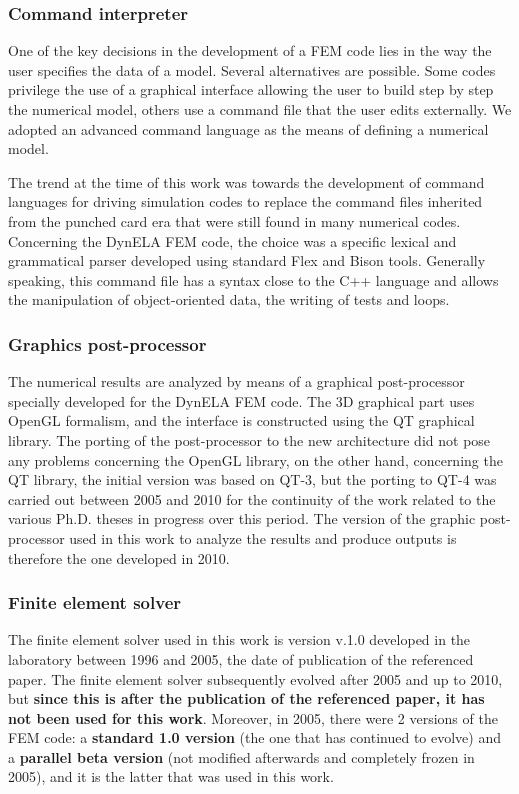 \subsubsection{Command interpreter}
One of the key decisions in the development of a FEM code lies in the way the user specifies the data of a model. Several alternatives are possible. Some codes privilege the use of a graphical interface allowing the user to build step by step the numerical model, others use a command file that the user edits externally. We adopted an advanced command language as the means of defining a numerical model. 

The trend at the time of this work was towards the development of command languages for driving simulation codes to replace the command files inherited from the punched card era that were still found in many numerical codes. Concerning the DynELA FEM code, the choice was a specific lexical and grammatical parser developed using standard Flex and Bison tools. Generally speaking, this command file has a syntax close to the C++ language and allows the manipulation of object-oriented data, the writing of tests and loops. 
 
\subsubsection{Graphics post-processor}

The numerical results are analyzed by means of a graphical post-processor specially developed for the DynELA FEM code. The 3D graphical part uses OpenGL formalism, and the interface is constructed using the QT graphical library. The porting of the post-processor to the new architecture did not pose any problems concerning the OpenGL library, on the other hand, concerning the QT library, the initial version was based on QT-3, but the porting to QT-4 was carried out between 2005 and 2010 for the continuity of the work related to the various Ph.D. theses in progress over this period. The version of the graphic post-processor used in this work to analyze the results and produce outputs is therefore the one developed in 2010.

\subsubsection{Finite element solver}

The finite element solver used in this work is version v.1.0 developed in the laboratory between 1996 and 2005, the date of publication of the referenced paper. The finite element solver subsequently evolved after 2005 and up to 2010, but \textbf{since this is after the publication of the referenced paper, it has not been used for this work}. Moreover, in 2005, there were 2 versions of the FEM code: a \textbf{standard 1.0 version} (the one that has continued to evolve) and a \textbf{parallel beta version} (not modified afterwards and completely frozen in 2005), and it is the latter that was used in this work.

